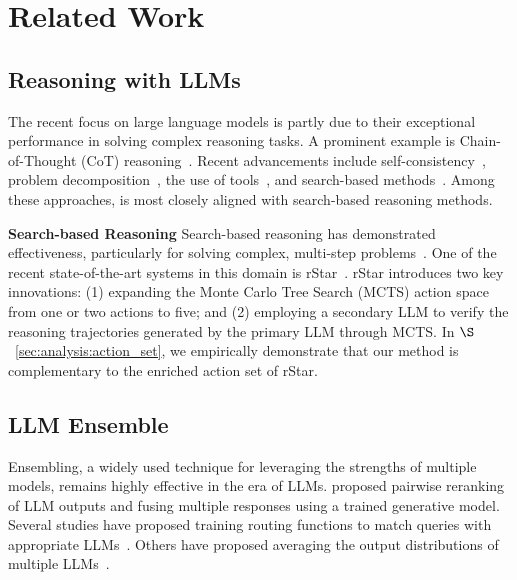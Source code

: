 \section{Related Work}

\subsection{Reasoning with LLMs}
The recent focus on large language models is partly due to their exceptional performance in solving complex reasoning tasks.
A prominent example is Chain-of-Thought (CoT) reasoning~\cite{wei2023chainofthoughtpromptingelicitsreasoning}.
Recent advancements include self-consistency~\cite{wang2023selfconsistency}, problem decomposition~\cite{zhou2023leasttomost}, the use of tools~\cite{pal,chen2023program}, and search-based methods~\cite{hao-etal-2023-reasoning,yao2024tree,qi2024mutual}. 
Among these approaches, \mosa{} is most closely aligned with search-based reasoning methods.

\textbf{Search-based Reasoning}
\hspace{5pt}
Search-based reasoning has demonstrated effectiveness, particularly for solving complex, multi-step problems~\cite{hao-etal-2023-reasoning,yao2024tree,chen2024understandingtreethoughtssucceeds,zhang2024accessinggpt4levelmathematical,chen2024alphamathzeroprocesssupervision,qi2024mutual,zhang2024restmctsllmselftrainingprocess,zhou2023language,koh2024treesearchlanguagemodel}. 
One of the recent state-of-the-art systems in this domain is rStar~\cite{qi2024mutual}. 
rStar introduces two key innovations: (1) expanding the Monte Carlo Tree Search (MCTS) action space from one or two actions to five; and (2) employing a secondary LLM to verify the reasoning trajectories generated by the primary LLM through MCTS.
In $\S$~\ref{sec:analysis:action_set}, we empirically demonstrate that our method is complementary to the enriched action set of rStar.












\subsection{LLM Ensemble}
Ensembling, a widely used technique for leveraging the strengths of multiple models, remains highly effective in the era of LLMs.
\citet{jiang-etal-2023-llm} proposed pairwise reranking of LLM outputs and fusing multiple responses using a trained generative model. 
Several studies have proposed training routing functions to match queries with appropriate LLMs~\cite{lu2023routingexpertefficientrewardguided,shnitzer2023largelanguagemodelrouting,wang2024fusing}. 
Others have proposed averaging the output distributions of multiple LLMs~\cite{huang2024ensemblelearningheterogeneouslarge}.

